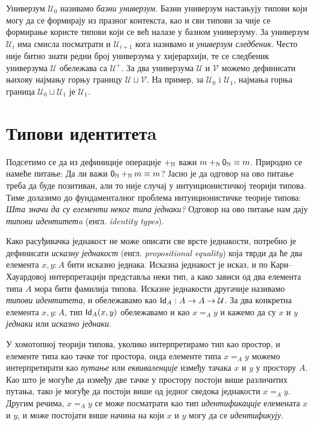 \documentclass[12pt,oneside]{memoir}
\begin{document}
Универзум $\mathcal{U}_0$ називамо \emph{базни универзум}. Базни универзум настањују типови који могу да се формирају из празног контекста, као и сви типови за чије се формирање користе типови који се већ налазе у базном универзуму. За универзум $\mathcal{U}_i$ има смисла посматрати и $\mathcal{U}_{i+1}$ кога називамо и \emph{универзум следбеник}. Често није битно знати редни број универзума у хијерархији, те се следбеник универзума $\mathcal{U}$ обележава са $\mathcal{U}^{+}$. За два универзума $\mathcal{U}$ и $\mathcal{V}$ можемо дефинисати њихову најмању горњу границу $\mathcal{U} \sqcup \mathcal{V}$. На пример, за $\mathcal{U}_0$ i $\mathcal{U}_1$, најмања горња граница $\mathcal{U}_0 \sqcup \mathcal{U}_1$ је $\mathcal{U}_1$.

\section{Типови идентитетa}
\label{sec:id}

Подсетимо се да из дефиниције операције $+_{\mathbb{N}}$ важи $m +_{\mathbb{N}} \mathsf{0}_\mathbb{N} \equiv m$. Природно се намеће питање: Да ли важи $\mathsf{0}_\mathbb{N} +_{\mathbb{N}} m \equiv m$? Јасно је да одговор на ово питање треба да буде позитиван, али то није случај у интуиционистичкој теорији типова. Тиме долазимо до фундаменталног проблема интуиционистичке теорије типова: \emph{Шта значи да су елементи неког типа једнаки?} Одговор на ово питање нам дају \emph{типови идентитетa} (енгл. \emph{identity types}).

Како расуђивачка једнакост не може описати све врсте једнакости, потребно је дефинисати \emph{исказну једнакост} (енгл. \emph{propositional equality}) која тврди да ће два елемента $x, y : A$ бити исказно једнака. Исказна једнакост је исказ, и по Кари--Хауардовој интерпретацији представља неки тип, а како зависи од два елемента типа $A$ мора бити фамилија типова. Исказне једнакости другачије називамо \emph{типови идентитета}, и обележавамо као $\mathsf{Id}_{A} : A \to A \to \mathcal{U}$. За два конкретна елемента $x, y : A$, тип $\mathsf{Id}_{A}(x, y)$ обележавамо и као $x =_A y$ и кажемо да су $x$ и $y$ \emph{једнаки} или \emph{исказно једнаки}.

У хомотопној теорији типова, уколико интерпретирамо тип као простор, и елементе типа као тачке тог простора, онда елементе типа $x =_A y$ можемо интерпретирати као \emph{путање} или \emph{еквиваленције} између тачака $x$ и $y$ у простору $A$. Као што је могуће да између две тачке у простору постоји више различитих путања, тако је могуђе да постоји више од једног сведока једнакости $x =_A y$. Другим речима, $x =_A y$ се може посматрати као тип \emph{идентификације} елемената $x$ и $y$, и може постојати више начина на који $x$ и $y$ могу да се \emph{идентификују}. 
\end{document}
